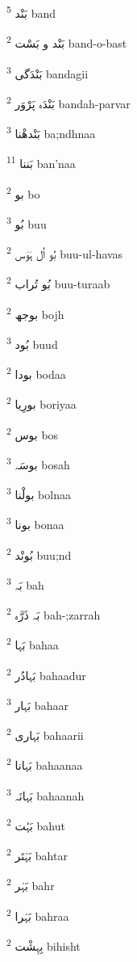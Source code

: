 \documentclass[12pt]{article}
\begin{document}
\begin{multicols}{5}
{\ur بَنْد}   \textsuperscript{5} band

{\ur بَنْد و بَسْت}   \textsuperscript{2} band-o-bast

{\ur بَنْدَگی}   \textsuperscript{3} bandagii

{\ur بَنْدَہ پَرْوَر}   \textsuperscript{2} bandah-parvar

{\ur بَنْدھْنا}   \textsuperscript{3} ba;ndhnaa

{\ur بَننا}   \textsuperscript{11} ban'naa

{\ur بو}   \textsuperscript{2} bo

{\ur بُو}   \textsuperscript{3} buu

{\ur بُو اُل ہَوَس}   \textsuperscript{2} buu-ul-havas

{\ur بُو تُراب}   \textsuperscript{2} buu-turaab

{\ur بوجھ}   \textsuperscript{2} bojh

{\ur بُود}   \textsuperscript{3} buud

{\ur بودا}   \textsuperscript{2} bodaa

{\ur بورِیا}   \textsuperscript{2} boriyaa

{\ur بوس}   \textsuperscript{2} bos

{\ur بوسَہ}   \textsuperscript{3} bosah

{\ur بولْنا}   \textsuperscript{3} bolnaa

{\ur بونا}   \textsuperscript{3} bonaa

{\ur بُونْد}   \textsuperscript{2} buu;nd

{\ur بَہ}   \textsuperscript{3} bah

{\ur بَہ ذَرَّہ}   \textsuperscript{2} bah-;zarrah

{\ur بَہا}   \textsuperscript{2} bahaa

{\ur بَہادُر}   \textsuperscript{2} bahaadur

{\ur بَہار}   \textsuperscript{3} bahaar

{\ur بَہاری}   \textsuperscript{2} bahaarii

{\ur بَہانا}   \textsuperscript{2} bahaanaa

{\ur بَہانَہ}   \textsuperscript{3} bahaanah

{\ur بَہُت}   \textsuperscript{2} bahut

{\ur بَہْتَر}   \textsuperscript{2} bahtar

{\ur بَہْر}   \textsuperscript{2} bahr

{\ur بَہْرا}   \textsuperscript{2} bahraa

{\ur بِہِشْت}   \textsuperscript{2} bihisht


\end{multicols}
\end{document}
